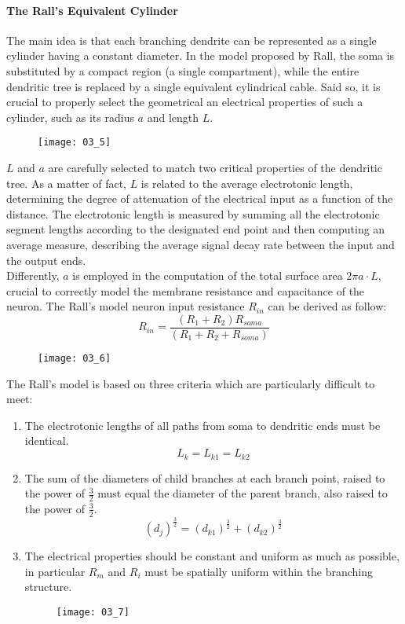 \paragraph{The Rall's Equivalent Cylinder}
The main idea is that each branching dendrite can be represented as a single cylinder
having a constant diameter. In the model proposed by Rall, the soma is substituted by
a compact region (a single compartment), while the entire dendritic tree is replaced by
a single equivalent cylindrical cable. Said so, it is crucial to properly select the
geometrical an electrical properties of such a cylinder, such as its radius \(a\) and
length \(L\).
\begin{figure}[H]
    \texttt{[image: 03\_5]}
    \centering
\end{figure}
\(L\) and \(a\) are carefully selected to match two critical properties of the dendritic
tree. As a matter of fact, \(L\) is related to the average electrotonic length,
determining the degree of attenuation of the electrical input as a function of the distance.
The electrotonic length is measured by summing all the electrotonic segment lengths according
to the designated end point and then computing an average measure, describing the average
signal decay rate between the input and the output ends.\\
Differently, \(a\) is employed in the computation of the total surface area \(2\pi{a}\cdot{L}\),
crucial to correctly model the membrane resistance and capacitance of the neuron. The Rall's
model neuron input resistance \(R_{in}\) can be derived as follow:
\begin{equation*}
    R_{in}=\frac{(R_{1}+R_{2})R_{soma}}{(R_{1}+R_{2}+R_{soma})}
\end{equation*}
\begin{figure}[H]
    \texttt{[image: 03\_6]}
    \centering
\end{figure}
The Rall's model is based on three criteria which are particularly difficult to meet:
\begin{enumerate}
    \item The electrotonic lengths of all paths from soma to dendritic ends must be identical.
          \begin{equation*}
              L_{k}=L_{k1}=L_{k2}
          \end{equation*}
    \item The sum of the diameters of child branches at each branch point, raised to the power
          of \(\frac{3}{2}\) must equal the diameter of the parent branch, also raised to the power
          of \(\frac{3}{2}\).
          \begin{equation*}
              (d_{j})^{\frac{3}{2}}=(d_{k1})^{\frac{3}{2}}+(d_{k2})^{\frac{3}{2}}
          \end{equation*}
    \item The electrical properties should be constant and uniform as much as possible, in
          particular \(R_{m}\) and \(R_{i}\) must be spatially uniform within the branching structure.
          \begin{figure}[H]
              \texttt{[image: 03\_7]}
              \centering
          \end{figure}
\end{enumerate}
